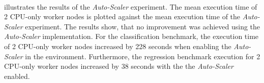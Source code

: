\paragraph{}
 illustrates the results of the \textit{Auto-Scaler} experiment. The mean execution time of 2 CPU-only worker nodes is plotted against the mean execution time of the \textit{Auto-Scaler} experiment.
The results show, that no improvement was achieved using the \textit{Auto-Scaler} implementation.
For the classification benchmark, the execution time of 2 CPU-only worker nodes increased by 228 seconds when enabling the \textit{Auto-Scaler} in the environment. Furthermore, the regression benchmark execution for 2 CPU-only worker nodes increased by 38 seconds with the the \textit{Auto-Scaler} enabled.

